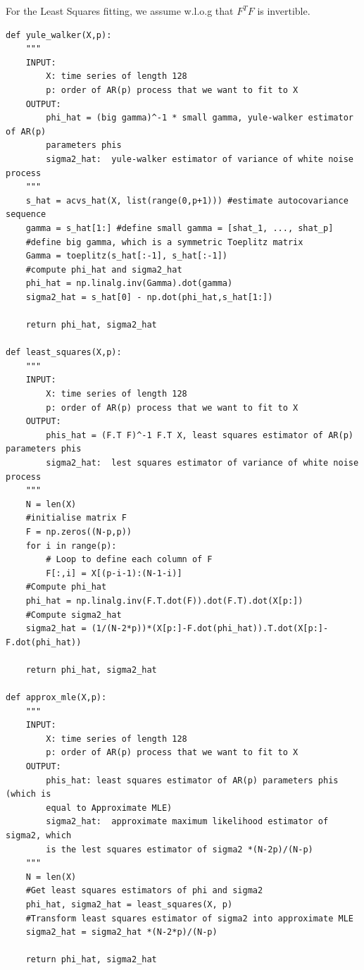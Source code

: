 \documentclass[a4paper,10pt]{article}
\theoremstyle{mytheor}
\begin{document}
For the Least Squares fitting, we assume w.l.o.g that $F^TF$ is invertible. 

\begin{lstlisting}
def yule_walker(X,p):
    """
    INPUT:
        X: time series of length 128
        p: order of AR(p) process that we want to fit to X
    OUTPUT:
        phi_hat = (big gamma)^-1 * small gamma, yule-walker estimator of AR(p)
        parameters phis
        sigma2_hat:  yule-walker estimator of variance of white noise process
    """
    s_hat = acvs_hat(X, list(range(0,p+1))) #estimate autocovariance sequence
    gamma = s_hat[1:] #define small gamma = [shat_1, ..., shat_p]
    #define big gamma, which is a symmetric Toeplitz matrix
    Gamma = toeplitz(s_hat[:-1], s_hat[:-1]) 
    #compute phi_hat and sigma2_hat
    phi_hat = np.linalg.inv(Gamma).dot(gamma)
    sigma2_hat = s_hat[0] - np.dot(phi_hat,s_hat[1:])
    
    return phi_hat, sigma2_hat

def least_squares(X,p):
    """
    INPUT:
        X: time series of length 128
        p: order of AR(p) process that we want to fit to X
    OUTPUT:
        phis_hat = (F.T F)^-1 F.T X, least squares estimator of AR(p) parameters phis
        sigma2_hat:  lest squares estimator of variance of white noise process
    """
    N = len(X)
    #initialise matrix F
    F = np.zeros((N-p,p))
    for i in range(p):
        # Loop to define each column of F
        F[:,i] = X[(p-i-1):(N-1-i)]
    #Compute phi_hat
    phi_hat = np.linalg.inv(F.T.dot(F)).dot(F.T).dot(X[p:])
    #Compute sigma2_hat
    sigma2_hat = (1/(N-2*p))*(X[p:]-F.dot(phi_hat)).T.dot(X[p:]-F.dot(phi_hat))
    
    return phi_hat, sigma2_hat

def approx_mle(X,p):
    """
    INPUT:
        X: time series of length 128
        p: order of AR(p) process that we want to fit to X
    OUTPUT:
        phis_hat: least squares estimator of AR(p) parameters phis (which is 
        equal to Approximate MLE)
        sigma2_hat:  approximate maximum likelihood estimator of sigma2, which
        is the lest squares estimator of sigma2 *(N-2p)/(N-p)
    """
    N = len(X)
    #Get least squares estimators of phi and sigma2
    phi_hat, sigma2_hat = least_squares(X, p)
    #Transform least squares estimator of sigma2 into approximate MLE
    sigma2_hat = sigma2_hat *(N-2*p)/(N-p)
    
    return phi_hat, sigma2_hat
\end{lstlisting}
\end{document}
